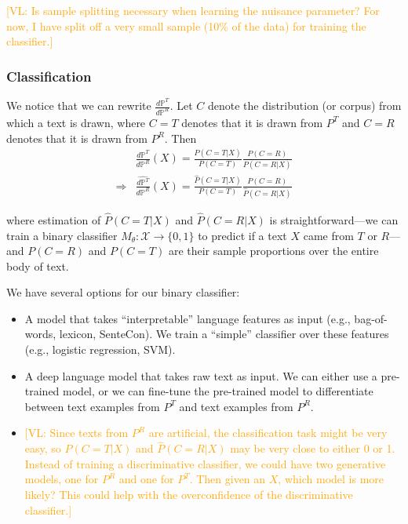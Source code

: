 \documentclass{article}
\newcommand{\vl}[1]{\textcolor{orange}{[VL: #1]}}
\begin{document}
\vl{Is sample splitting necessary when learning the nuisance parameter? For now, I have split off a very small sample (10\% of the data) for training the classifier.}

\subsubsection{Classification}
\label{sec:classification}

We notice that we can rewrite $\frac{d\mathbb{P}^T}{d\mathbb{P}^R}$. Let $C$ denote the distribution (or corpus) from which a text is drawn, where $C=T$ denotes that it is drawn from $P^T$ and $C=R$ denotes that it is drawn from $P^R$. Then
\begin{equation*}
    \begin{split}
        &\frac{d\mathbb{P}^T}{d\mathbb{P}^R}(X) = \frac{P(C=T|X)}{P(C=T)}\frac{P(C=R)}{P(C=R|X)}\\
        \Rightarrow &\frac{\hat{d\mathbb{P}^T}}{d\mathbb{P}^R}(X) = \frac{\hat{P}(C=T|X)}{P(C=T)}\frac{P(C=R)}{\hat{P}(C=R|X)}
    \end{split}
\end{equation*}

where estimation of $\hat{P}(C=T|X)$ and $\hat{P}(C=R|X)$ is straightforward---we can train a binary classifier $M_\theta: \mathcal{X} \rightarrow \{0,1\}$ to predict if a text $X$ came from $T$ or $R$---and $P(C=R)$ and $P(C=T)$ are their sample proportions over the entire body of text.

We have several options for our binary classifier:
\begin{itemize}
    \item A model that takes ``interpretable'' language features as input (e.g., bag-of-words, lexicon, SenteCon). We train a ``simple'' classifier over these features (e.g., logistic regression, SVM).
    \item A deep language model that takes raw text as input. We can either use a pre-trained model, or we can fine-tune the pre-trained model to differentiate between text examples from $P^T$ and text examples from $P^R$.
    \item \vl{Since texts from $P^R$ are artificial, the classification task might be very easy, so $\hat{P}(C=T|X)$ and $\hat{P}(C=R|X)$ may be very close to either 0 or 1. Instead of training a discriminative classifier, we could have two generative models, one for $P^R$ and one for $P^T$. Then given an $X$, which model is more likely? This could help with the overconfidence of the discriminative classifier.}
\end{itemize}
\end{document}
